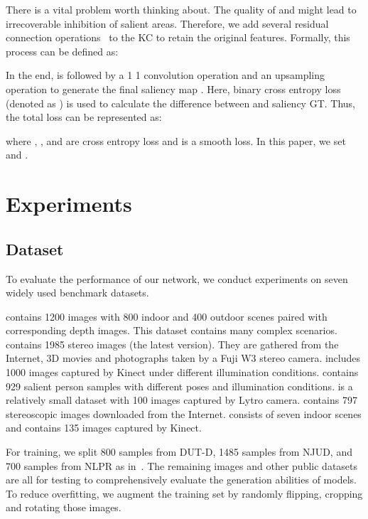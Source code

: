 \documentclass[runningheads]{llncs}
\begin{document}
There is a vital problem worth thinking about.
The quality of  and  might lead to irrecoverable inhibition of salient areas.
Therefore, we add several residual connection operations~\cite{ResNet} to the KC to retain the original features.
Formally, this process can be defined as:



In the end,  is followed by a 1  1 convolution operation and an upsampling operation to generate the final saliency map .
Here, binary cross entropy loss (denoted as ) is used to calculate the difference between  and saliency GT.
Thus, the total loss  can be represented as:

where , , and  are cross entropy loss and  is a smooth  loss.
In this paper, we set  and .



\section{Experiments}

\subsection{Dataset}
To evaluate the performance of our network, we conduct experiments on seven widely used benchmark datasets.

 contains 1200 images with 800 indoor and 400 outdoor scenes paired with corresponding depth images. This dataset contains many complex scenarios.
 contains 1985 stereo images (the latest version). They are gathered from the Internet, 3D movies and photographs taken by a Fuji W3 stereo camera.
 includes 1000 images captured by Kinect under different illumination conditions.
 contains 929 salient person samples with different poses and illumination conditions.
 is a relatively small dataset with 100 images captured by Lytro camera.
 contains 797 stereoscopic images downloaded from the Internet.
  consists of seven indoor scenes and contains 135 images captured by Kinect.

For training, we split 800 samples from DUT-D, 1485 samples from NJUD, and 700 samples from NLPR as in~\cite{3DPCA,3DTANet,3DDMRA}.
The remaining images and other public datasets are all for testing to comprehensively evaluate the generation abilities of models.
To reduce overfitting, we augment the training set by randomly flipping, cropping and rotating those images.
\end{document}
